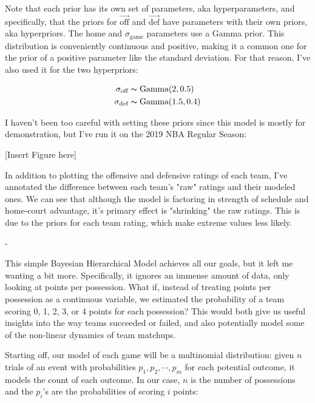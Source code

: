 \documentclass[12 pt]{article}
\begin{document}
\begin{flushleft}
Note that each prior has its own set of parameters, aka hyperparameters, and specifically, that the priors for $ \overrightarrow{\text{off}} $ and $ \overrightarrow{\text{def}} $ have parameters with their own priors, aka hyperpriors.
The $ \text{home} $ and $ \sigma_{\text{game}} $ parameters use a Gamma prior.
This distribution is conveniently continuous and positive, making it a common one for the prior of a positive parameter like the standard deviation.
For that reason, I've also used it for the two hyperpriors:

\begin{align}
    \sigma_{\text{off}} &\thicksim \text{Gamma}(2, 0.5) \notag \\
    \sigma_{\text{def}} &\thicksim \text{Gamma}(1.5, 0.4) \notag \\
\end{align}

I haven't been too careful with setting these priors since this model is mostly for demonstration, but I've run it on the 2019 NBA Regular Season:

[Insert Figure here]

In addition to plotting the offensive and defensive ratings of each team, I've annotated the difference between each team's "raw" ratings and their modeled ones.
We can see that although the model is factoring in strength of schedule and home-court advantage, it's primary effect is "shrinking" the raw ratings.
This is due to the priors for each team rating, which make extreme values less likely.

-

This simple Bayesian Hierarchical Model achieves all our goals, but it left me wanting a bit more.
Specifically, it ignores an immense amount of data, only looking at points per possession.
What if, instead of treating points per possession as a continuous variable, we estimated the probability of a team scoring 0, 1, 2, 3, or 4 points for each possession?
This would both give us useful insights into the way teams succeeded or failed, and also potentially model some of the non-linear dynamics of team matchups.

\vspace{5mm}

Starting off, our model of each game will be a multinomial distribution: given $ n $ trials of an event with probabilities $ p_1, p_2, \cdots, p_m $ for each potential outcome, it models the count of each outcome.
In our case, $ n $ is the number of possessions and the $ p_i $'s are the probabilities of scoring $ i $ points:


\end{flushleft}
\end{document}
